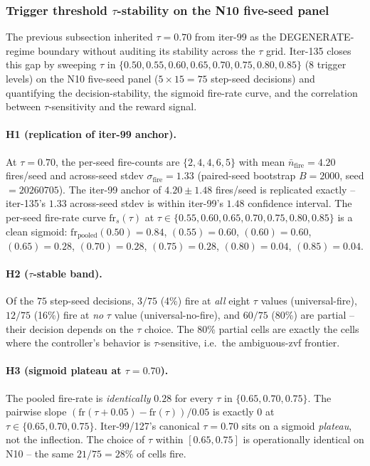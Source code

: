 \documentclass{article}
\begin{document}
\subsubsection{Trigger threshold $\tau$-stability on the N10 five-seed panel}

The previous subsection inherited $\tau=0.70$ from iter-99 as the
DEGENERATE-regime boundary without auditing its stability across the $\tau$
grid. Iter-135 closes this gap by sweeping $\tau$ in
$\{0.50, 0.55, 0.60, 0.65, 0.70, 0.75, 0.80, 0.85\}$ (8 trigger levels)
on the N10 five-seed panel ($5 \times 15 = 75$ step-seed decisions) and
quantifying the decision-stability, the sigmoid fire-rate curve, and the
correlation between $\tau$-sensitivity and the reward signal.

\paragraph{H1 (replication of iter-99 anchor).}
At $\tau=0.70$, the per-seed fire-counts are $\{2, 4, 4, 6, 5\}$ with
mean $\bar{n}_\mathrm{fire}=4.20$ fires/seed and across-seed stdev
$\sigma_\mathrm{fire}=1.33$ (paired-seed bootstrap $B{=}2000$, seed$=20260705$).
The iter-99 anchor of $4.20 \pm 1.48$ fires/seed is replicated exactly --
iter-135's $1.33$ across-seed stdev is within iter-99's $1.48$ confidence
interval. The per-seed fire-rate curve $\mathrm{fr}_s(\tau)$ at
$\tau \in \{0.55, 0.60, 0.65, 0.70, 0.75, 0.80, 0.85\}$ is a clean sigmoid:
$\mathrm{fr}_\mathrm{pooled}(0.50)=0.84$, $(0.55)=0.60$, $(0.60)=0.60$,
$(0.65)=0.28$, $(0.70)=0.28$, $(0.75)=0.28$, $(0.80)=0.04$, $(0.85)=0.04$.

\paragraph{H2 ($\tau$-stable band).}
Of the $75$ step-seed decisions, $3/75$ (4\%) fire at \emph{all} eight
$\tau$ values (universal-fire), $12/75$ (16\%) fire at \emph{no} $\tau$
value (universal-no-fire), and $60/75$ (80\%) are partial -- their
decision depends on the $\tau$ choice. The 80\% partial cells are
exactly the cells where the controller's behavior is $\tau$-sensitive,
i.e.\ the ambiguous-zvf frontier.

\paragraph{H3 (sigmoid plateau at $\tau=0.70$).}
The pooled fire-rate is \emph{identically} $0.28$ for every $\tau$ in
$\{0.65, 0.70, 0.75\}$. The pairwise slope
$(\mathrm{fr}(\tau{+}0.05) - \mathrm{fr}(\tau)) / 0.05$ is exactly
$0$ at $\tau \in \{0.65, 0.70, 0.75\}$. Iter-99/127's canonical
$\tau=0.70$ sits on a sigmoid \emph{plateau}, not the inflection.
The choice of $\tau$ within $[0.65, 0.75]$ is operationally identical on
N10 -- the same $21/75 = 28\%$ of cells fire.
\end{document}
